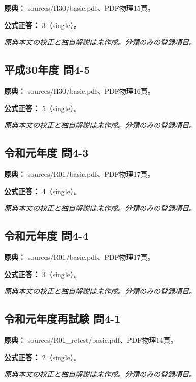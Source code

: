 \noindent\textbf{原典：} sources/H30/basic.pdf、PDF物理15頁。

\textbf{公式正答：} 3（single）。

\par\textit{原典本文の校正と独自解説は未作成。分類のみの登録項目。}

\subsection{平成30年度 問4-5}
\label{q:h30-reg-basic-4-5}

\noindent\textbf{原典：} sources/H30/basic.pdf、PDF物理16頁。

\textbf{公式正答：} 5（single）。

\par\textit{原典本文の校正と独自解説は未作成。分類のみの登録項目。}

\subsection{令和元年度 問4-3}
\label{q:r01-reg-basic-4-3}

\noindent\textbf{原典：} sources/R01/basic.pdf、PDF物理17頁。

\textbf{公式正答：} 4（single）。

\par\textit{原典本文の校正と独自解説は未作成。分類のみの登録項目。}

\subsection{令和元年度 問4-4}
\label{q:r01-reg-basic-4-4}

\noindent\textbf{原典：} sources/R01/basic.pdf、PDF物理17頁。

\textbf{公式正答：} 3（single）。

\par\textit{原典本文の校正と独自解説は未作成。分類のみの登録項目。}

\subsection{令和元年度再試験 問4-1}
\label{q:r01-ret-basic-4-1}

\noindent\textbf{原典：} sources/R01\_retest/basic.pdf、PDF物理14頁。

\textbf{公式正答：} 2（single）。

\par\textit{原典本文の校正と独自解説は未作成。分類のみの登録項目。}

